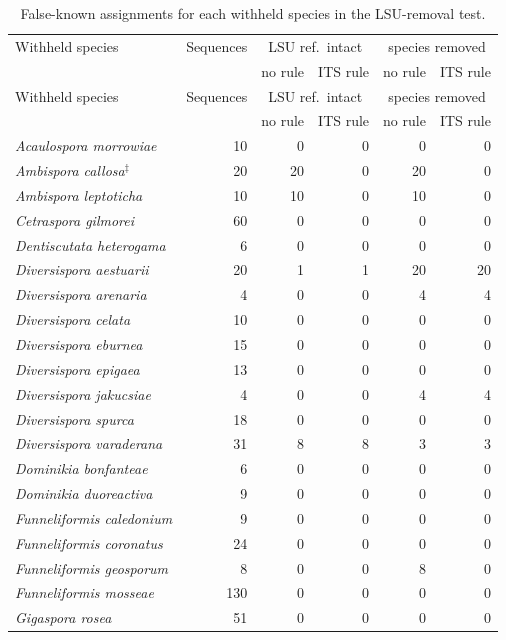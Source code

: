 {\small\begin{longtable}{lrrrrr}
\caption{False-known assignments for each withheld species in the LSU-removal test.}\label{tab:m4folds}\\
\toprule
Withheld species & Sequences & \multicolumn{2}{c}{LSU ref.\ intact} & \multicolumn{2}{c}{species removed}\\
 & & no rule & ITS rule & no rule & ITS rule\\
\midrule
\endfirsthead
\toprule
Withheld species & Sequences & \multicolumn{2}{c}{LSU ref.\ intact} & \multicolumn{2}{c}{species removed}\\
 & & no rule & ITS rule & no rule & ITS rule\\
\midrule
\endhead
\bottomrule
\endfoot
\emph{Acaulospora morrowiae} & 10 & 0 & 0 & 0 & 0\\
\emph{Ambispora callosa}$^{\ddagger}$ & 20 & 20 & 0 & 20 & 0\\
\emph{Ambispora leptoticha} & 10 & 10 & 0 & 10 & 0\\
\emph{Cetraspora gilmorei} & 60 & 0 & 0 & 0 & 0\\
\emph{Dentiscutata heterogama} & 6 & 0 & 0 & 0 & 0\\
\emph{Diversispora aestuarii} & 20 & 1 & 1 & 20 & 20\\
\emph{Diversispora arenaria} & 4 & 0 & 0 & 4 & 4\\
\emph{Diversispora celata} & 10 & 0 & 0 & 0 & 0\\
\emph{Diversispora eburnea} & 15 & 0 & 0 & 0 & 0\\
\emph{Diversispora epigaea} & 13 & 0 & 0 & 0 & 0\\
\emph{Diversispora jakucsiae} & 4 & 0 & 0 & 4 & 4\\
\emph{Diversispora spurca} & 18 & 0 & 0 & 0 & 0\\
\emph{Diversispora varaderana} & 31 & 8 & 8 & 3 & 3\\
\emph{Dominikia bonfanteae} & 6 & 0 & 0 & 0 & 0\\
\emph{Dominikia duoreactiva} & 9 & 0 & 0 & 0 & 0\\
\emph{Funneliformis caledonium} & 9 & 0 & 0 & 0 & 0\\
\emph{Funneliformis coronatus} & 24 & 0 & 0 & 0 & 0\\
\emph{Funneliformis geosporum} & 8 & 0 & 0 & 8 & 0\\
\emph{Funneliformis mosseae} & 130 & 0 & 0 & 0 & 0\\
\emph{Gigaspora rosea} & 51 & 0 & 0 & 0 & 0\\

\end{longtable}}
